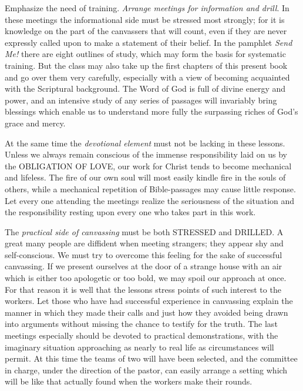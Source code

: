 \documentclass[
]{book}
\begin{document}
Emphasize the need of training. \emph{Arrange meetings for information and drill}. In these meetings the informational side must be stressed most strongly; for it is knowledge on the part of the canvassers that will count, even if they are never expressly called upon to make a statement of their belief. In the pamphlet \emph{Send Me!} there are eight outlines of study, which may form the basis for systematic training. But the class may also take up the first chapters of this present book and go over them very carefully, especially with a view of becoming acquainted with the Scriptural background. The Word of God is full of divine energy and power, and an intensive study of any series of passages will invariably bring blessings which enable us to understand more fully the surpassing riches of God's grace and mercy.

At the same time the \emph{devotional element} must not be lacking in these lessons. Unless we always remain conscious of the immense responsibility laid on us by the OBLIGATION OF LOVE, our work for Christ tends to become mechanical and lifeless. The fire of our own soul will most easily kindle fire in the souls of others, while a mechanical repetition of Bible-passages may cause little response. Let every one attending the meetings realize the seriousness of the situation and the responsibility resting upon every one who takes part in this work.

The \emph{practical side of canvassing} must be both STRESSED and DRILLED. A great many people are diffident when meeting strangers; they appear shy and self-conscious. We must try to overcome this feeling for the sake of successful canvassing. If we present ourselves at the door of a strange house with an air which is either too apologetic or too bold, we may spoil our approach at once. For that reason it is well that the lessons stress points of such interest to the workers. Let those who have had successful experience in canvassing explain the manner in which they made their calls and just how they avoided being drawn into arguments without missing the chance to testify for the truth. The last meetings especially should be devoted to practical demonstrations, with the imaginary situation approaching as nearly to real life as circumstances will permit. At this time the teams of two will have been selected, and the committee in charge, under the direction of the pastor, can easily arrange a setting which will be like that actually found when the workers make their rounds.
\end{document}
